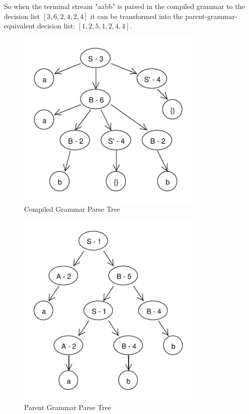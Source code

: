 \documentclass[11pt]{article}
\begin{document}
So when the terminal stream "aabb" is parsed in the compiled
grammar to the decision list $[3, 6, 2, 4, 2, 4]$ it can be transformed
into the parent-grammar-equivalent decision list: $[1, 2, 5, 1, 2, 4, 4]$.

\begin{figure}[p]
    \centering
    \includegraphics[width=0.8\textwidth,natwidth=458,natheight=444]{compiled_ex.pdf}
    \caption{Compiled Grammar Parse Tree}
    \label{fig:compiled_ex}
\end{figure}
\begin{figure}[p]
    \centering
    \includegraphics[width=0.8\textwidth,natwidth=472,natheight=500]{decompiled_ex.pdf}
    \caption{Parent Grammar Parse Tree}
    \label{fig:decompiled_ex}
\end{figure}

{}

\end{document}
